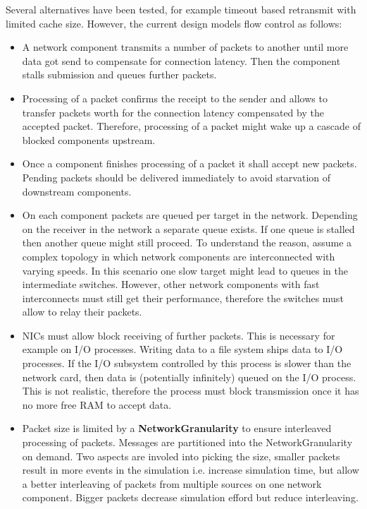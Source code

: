 \documentclass[
     11pt,         %
     a4paper,      %
     BCOR10mm,     %
     DIV14,        %
     liststotoc,   %
     bibtotoc,     %
     idxtotoc,     %
     parskip       %
     ]{scrreprt}   %
\begin{document}
Several alternatives have been tested, for example timeout based retransmit with limited cache size.
However, the current design models flow control as follows:
\begin{itemize}
 \item A network component transmits a number of packets to another until more data got send to compensate for connection  latency. 
 Then the component stalls submission and queues further packets. 
 \item Processing of a packet confirms the receipt to the sender and allows to transfer packets worth for the connection latency compensated by the accepted packet. 
 Therefore, processing of a packet might wake up a cascade of blocked components upstream.
 \item Once a component finishes processing of a packet it shall accept new packets. Pending packets should be delivered immediately to avoid starvation of downstream components.
 \item On each component packets are queued per target in the network. 
  Depending on the receiver in the network a separate queue exists.
  If one queue is stalled then another queue might still proceed. 
  To understand the reason, assume a complex topology in which network components are interconnected with varying speeds. 
  In this scenario one slow target might lead to queues in the intermediate switches. 
  However, other network components with fast interconnects must still get their performance, therefore the switches must allow to relay their packets. 
 \item NICs must allow block receiving of further packets. 
  This is necessary for example on I/O processes. 
  Writing data to a file system ships data to I/O processes. If the I/O subsystem controlled by this process is slower than the network card, then data is (potentially infinitely) queued on the I/O process. 
  This is not realistic, therefore the process must block transmission once it has no more free RAM to accept data.
  \item Packet size is limited by a \textbf{NetworkGranularity} to ensure interleaved processing of packets. 
  Messages are partitioned into the NetworkGranularity on demand. 
  Two aspects are involed into picking the size, smaller packets result in more events in the simulation i.e. increase simulation time, but allow a better interleaving of packets from multiple sources on one network component.   
  Bigger packets decrease simulation efford but reduce interleaving. 
\end{itemize}
\end{document}
